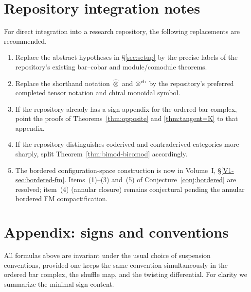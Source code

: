 \section{Repository integration notes}

For direct integration into a research repository, the following replacements are recommended.

\begin{enumerate}[label=(\arabic*)]
\item Replace the abstract hypotheses in \S\ref{sec:setup} by the precise labels of the repository's
existing bar--cobar and module/comodule theorems.

\item Replace the shorthand notation $\widehat\otimes$ and $\mathbin{\otimes^{\mathrm{ch}}}$ by the repository's preferred
completed tensor notation and chiral monoidal symbol.

\item If the repository already has a sign appendix for the ordered bar complex, point the proofs of
Theorems~\ref{thm:opposite} and \ref{thm:tangent=K} to that appendix.

\item If the repository distinguishes coderived and contraderived categories more sharply, split
Theorem~\ref{thm:bimod-bicomod} accordingly.

\item The bordered configuration-space construction is now in Volume~I,
\S\ref*{V1-sec:bordered-fm}.
Items~(1)--(3) and~(5) of Conjecture~\ref{conj:bordered} are resolved;
item~(4) (annular closure) remains conjectural pending the annular
bordered FM compactification.
\end{enumerate}

\appendix

\section{Appendix: signs and conventions}

All formulas above are invariant under the usual choice of suspension conventions, provided one keeps
the same convention simultaneously in the ordered bar complex, the shuffle map, and the twisting
differential. For clarity we summarize the minimal sign content.

